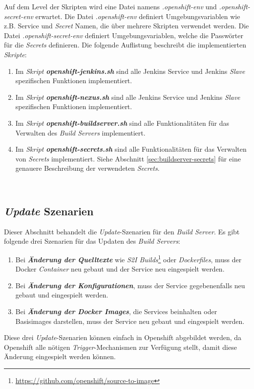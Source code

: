Auf dem Level der Skripten wird eine Datei namens \emph{.openshift-env} und \emph{.openshift-secret-env} erwartet. Die Datei \emph{.openshift-env} definiert Umgebungsvariablen wie z.B. Service und \emph{Secret} Namen, die über mehrere Skripten verwendet werden. Die Datei \emph{.openshift-secret-env} definiert Umgebungsvariablen, welche die Passwörter für die \emph{Secrets} definieren. Die folgende Auflistung beschreibt die implementierten \emph{Skripte}:
\begin{enumerate}
	\item Im \emph{Skript} \textbf{\emph{openshift-jenkins.sh}} sind alle Jenkins Service und Jenkins \emph{Slave} spezifischen Funktionen implementiert.
	\item Im \emph{Skript} \textbf{\emph{openshift-nexus.sh}} sind alle Jenkins Service und Jenkins \emph{Slave} spezifischen Funktionen implementiert.
	\item Im \emph{Skript} \textbf{\emph{openshift-buildserver.sh}} sind alle Funktionalitäten für das Verwalten des \emph{Build Servers} implementiert.
	\item Im \emph{Skript} \textbf{\emph{openshift-secrets.sh}} sind alle Funktionalitäten für das Verwalten von \emph{Secrets} implementiert. Siehe Abschnitt \ref{sec:buildserver-secrets} für eine genauere Beschreibung der verwendeten \emph{Secrets}.
\end{enumerate}
\ 
\subsection{\emph{Update} Szenarien}
\label{sec:buildserver-updates}
Dieser Abschnitt behandelt die \emph{Update}-Szenarien für den \emph{Build Server}. Es gibt folgende drei Szenarien für das Updaten des \emph{Build Servers}:

\begin{enumerate}
	\item Bei \textbf{\emph{Änderung der Quelltexte}} wie \emph{S2I Builds}\footnote{\url{https://github.com/openshift/source-to-image}} oder \emph{Dockerfiles}, muss der Docker \emph{Container} neu gebaut und der Service neu eingespielt werden.
	\item Bei \textbf{\emph{Änderung der Konfigurationen}}, muss der Service gegebenenfalls neu gebaut und eingespielt werden.
	\item Bei \textbf{\emph{Änderung der Docker Images}}, die Services beinhalten oder Basisimages darstellen, muss der Service neu gebaut und eingespielt werden.
\end{enumerate}
Diese drei \emph{Update}-Szenarien können einfach in Openshift abgebildet werden, da Openshift alle nötigen \emph{Trigger}-Mechanismen zur Verfügung stellt, damit diese Änderung eingespielt werden können. 
\newpage

